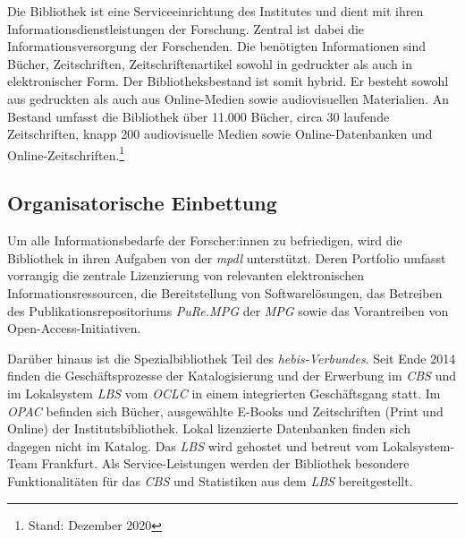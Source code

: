 Die Bibliothek ist eine Serviceeinrichtung des Institutes und dient mit ihren Informationsdienstleistungen 
der Forschung.
Zentral ist dabei die Informationsversorgung der Forschenden. Die benötigten Informationen sind Bücher, 
Zeitschriften, Zeitschriftenartikel sowohl in gedruckter als auch in elektronischer Form.
Der Bibliotheksbestand ist somit hybrid. Er besteht sowohl aus gedruckten als auch aus Online-Medien sowie 
audiovisuellen Materialien. An Bestand umfasst die Bibliothek über 11.000 Bücher, circa 30 laufende Zeitschriften, 
knapp 200 audiovisuelle Medien sowie Online-Datenbanken und Online-Zeitschriften.\footnote{Stand: Dezember 2020}

\subsection{Organisatorische Einbettung}
Um alle Informationsbedarfe der Forscher:innen zu befriedigen, wird die Bibliothek in ihren Aufgaben von der
\textit{\acrlong{mpdl}} unterstützt. Deren Portfolio umfasst vorrangig die zentrale 
Lizenzierung von relevanten elektronischen Informationsressourcen, die Bereitstellung von Softwarelösungen, 
das Betreiben des Publikationsrepositoriums \textit{\acrshort{PuRe.MPG}} der \textit{\acrlong{MPG}} sowie
das Vorantreiben von Open-Access-Initiativen. 

Darüber hinaus ist die Spezialbibliothek Teil des \textit{\acrshort{hebis}-Verbundes}. 
Seit Ende 2014 finden die Geschäftsprozesse der Katalogisierung und der Erwerbung im \textit{\acrfull{CBS}} und 
im Lokalsystem \textit{\acrfull{LBS}} vom \textit{\acrshort{OCLC}} in einem integrierten Geschäftsgang statt. Im \textit{\acrfull{OPAC}} befinden sich Bücher, ausgewählte E-Books 
und Zeitschriften (Print und Online) der Institutsbibliothek. Lokal lizenzierte Datenbanken finden sich dagegen
nicht im Katalog. Das \textit{\acrshort{LBS}} wird gehostet und betreut 
vom Lokalsystem-Team Frankfurt. Als Service-Leistungen werden der Bibliothek besondere Funktionalitäten 
für das \textit{\acrlong{CBS}} und Statistiken aus dem \textit{\acrshort{LBS}} bereitgestellt.


